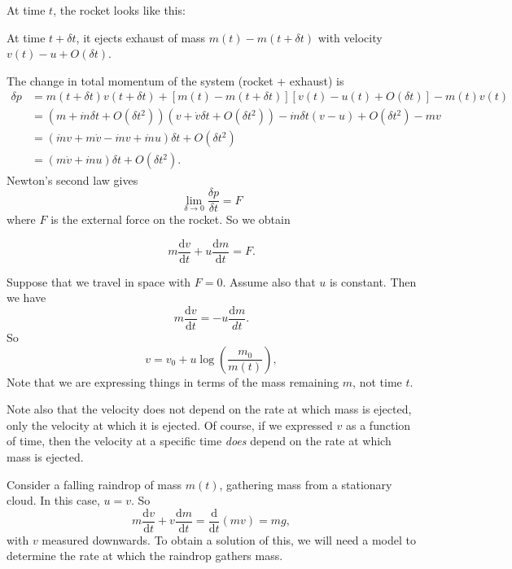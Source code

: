 At time $t$, the rocket looks like this:
\begin{center}
\end{center}
At time $t + \delta t$, it ejects exhaust of mass $m(t) - m(t + \delta t)$ with velocity $v(t) - u + O(\delta t)$.
\begin{center}
\end{center}
The change in total momentum of the system (rocket + exhaust) is
\begin{align*}
  \delta p &= m(t + \delta t)v(t + \delta t) + [m(t) - m(t + \delta t)][v(t) - u(t) + O(\delta t)] - m(t)v(t)\\
  &= (m + \dot{m}\delta t + O(\delta t^2))(v + \dot{v} \delta t + O(\delta t^2)) - \dot{m}\delta t(v - u) + O(\delta t^2) - mv\\
  &= (\dot{m}v + m\dot{v} - \dot{m}v + \dot{m}u)\delta t + O(\delta t^2)\\
  &= (m\dot{v} + \dot{m}u)\delta t + O(\delta t^2).
\end{align*}
Newton's second law gives
\[
  \lim_{\delta \to 0} \frac{\delta p}{\delta t} = F
\]
where $F$ is the external force on the rocket. So we obtain
\begin{proposition}
  \[
    m\frac{\mathrm{d} v}{\mathrm{d} t} + u\frac{\mathrm{d} m}{\mathrm{d} t} = F.
  \]
\end{proposition}
\begin{example}
  Suppose that we travel in space with $F = 0$. Assume also that $u$ is constant. Then we have
  \[
    m\frac{\mathrm{d} v}{\mathrm{d} t} = -u\frac{\mathrm{d} m}{d t}.
  \]
  So
  \[
    v = v_0 + u \log \left(\frac{m_0}{m(t)}\right),
  \]
  Note that we are expressing things in terms of the mass remaining $m$, not time $t$.

  Note also that the velocity does not depend on the rate at which mass is ejected, only the velocity at which it is ejected. Of course, if we expressed $v$ as a function of time, then the velocity at a specific time \emph{does} depend on the rate at which mass is ejected.
\end{example}

\begin{example}
  Consider a falling raindrop of mass $m(t)$, gathering mass from a stationary cloud. In this case, $u = v$. So
  \[
    m\frac{\mathrm{d} v}{\mathrm{d} t} + v\frac{\mathrm{d} m}{\mathrm{d} t} = \frac{\mathrm{d} }{\mathrm{d} t}(mv) = mg,
  \]
  with $v$ measured downwards. To obtain a solution of this, we will need a model to determine the rate at which the raindrop gathers mass.
\end{example}